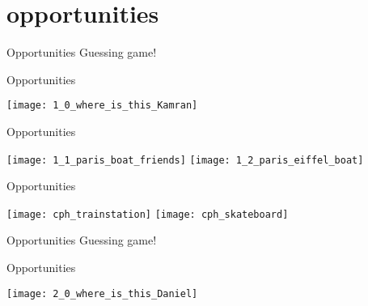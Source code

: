 \section{opportunities}

\begin{frame}{Opportunities}
Guessing game!
\end{frame}

\begin{frame}{Opportunities}
\begin{center}
\texttt{[image: 1\_0\_where\_is\_this\_Kamran]}
\end{center}
\end{frame}

\begin{frame}{Opportunities}
\begin{center}
\texttt{[image: 1\_1\_paris\_boat\_friends]}
\texttt{[image: 1\_2\_paris\_eiffel\_boat]}
\end{center}
\end{frame}

\begin{frame}{Opportunities}
\begin{center}
\texttt{[image: cph\_trainstation]}
\texttt{[image: cph\_skateboard]}
\end{center}
\end{frame}

\begin{frame}{Opportunities}
Guessing game!
\end{frame}

\begin{frame}{Opportunities}
\begin{center}
\texttt{[image: 2\_0\_where\_is\_this\_Daniel]}
\end{center}
\end{frame}


